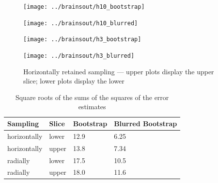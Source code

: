 \documentclass[article]{jdssv}
\begin{document}
\begin{figure}
\begin{centering}

\parbox{\imsizes}{\texttt{[image: ../brainsout/h10\_bootstrap]}}
\hfill
\parbox{\imsizes}{\texttt{[image: ../brainsout/h10\_blurred]}}

\vspace{\vertsep}

\parbox{\imsizes}{\texttt{[image: ../brainsout/h3\_bootstrap]}}
\hfill
\parbox{\imsizes}{\texttt{[image: ../brainsout/h3\_blurred]}}

\end{centering}
\caption{Horizontally retained sampling
--- upper plots display the upper slice; lower plots display the lower}
\label{blurredh}
\end{figure}



\begin{table}
\caption{Square roots of the sums of the squares of the error estimates}
\label{blurring}
\begin{centering}

\vspace{.125in}

\begin{tabular}{llll}
\hline
    Sampling & Slice & Bootstrap & Blurred Bootstrap \\\hline
horizontally & lower &      12.9 &              6.25 \\
horizontally & upper &      13.8 &              7.34 \\
    radially & lower &      17.5 &              10.5 \\
    radially & upper &      18.0 &              11.6 \\\hline
\end{tabular}

\end{centering}
\end{table}
\end{document}
